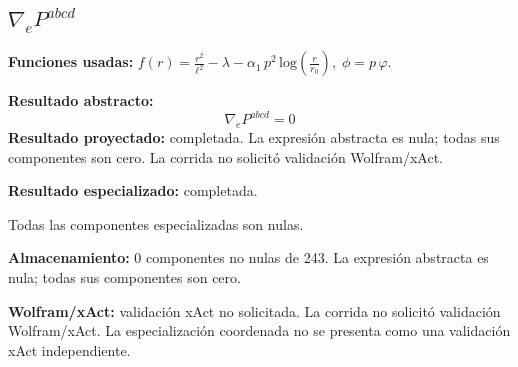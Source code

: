 \documentclass[11pt]{article}
\begin{document}
\subsection*{$ \nabla_e P^{abcd} $}
\textbf{Funciones usadas:} $ f\!\left(r\right) = \frac{{r}^{2}}{{\ell}^{2}} - \lambda - \alpha_{1}\,{p}^{2}\,\mathrm{log}\!\left(\frac{r}{r_{0}}\right),\;\phi=p\,\varphi $.\par
\textbf{Resultado abstracto:}
\begin{dmath*}[breakdepth={5}]
\nabla_e P^{abcd} = 0
\end{dmath*}
\textbf{Resultado proyectado:} completada. La expresión abstracta es nula; todas sus componentes son cero. La corrida no solicitó validación Wolfram/xAct.\par
\textbf{Resultado especializado:} completada.\par
Todas las componentes especializadas son nulas.\par
\textbf{Almacenamiento:} 0 componentes no nulas de 243. La expresión abstracta es nula; todas sus componentes son cero.\par
\textbf{Wolfram/xAct:} validación xAct no solicitada. La corrida no solicitó validación Wolfram/xAct. La especialización coordenada no se presenta como una validación xAct independiente.\par\medskip
{}
\end{document}

